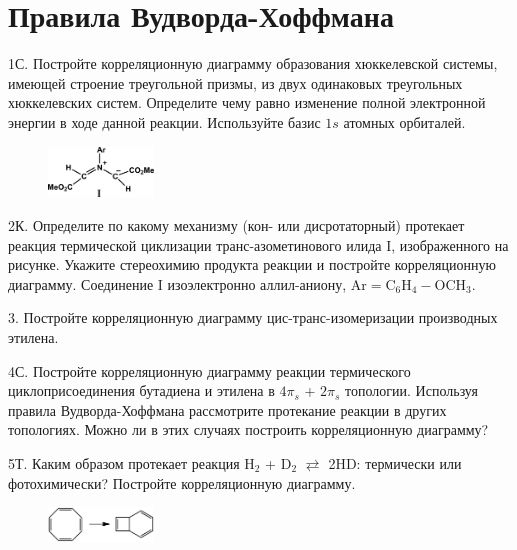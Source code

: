\setmainfont{Noto Serif}
\setsansfont{Noto Sans}
\setmonofont{Noto Sans Mono}

\section{Правила Вудворда-Хоффмана}
1С. Постройте корреляционную диаграмму образования хюккелевской системы, имеющей строение треугольной призмы, из двух одинаковых треугольных хюккелевских систем. Определите чему равно изменение полной электронной энергии в ходе данной реакции. Используйте базис $1s$ атомных орбиталей.
\par
\begin{figure} %
    \centering
    \vspace{-1mm}
    \includegraphics[width=28mm]{images/Fig_2_1_2.png}
    \vspace{0mm}
\end{figure}
2К. Определите по какому механизму (кон- или дисротаторный) протекает реакция термической циклизации транс-азометинового илида I, изображенного на рисунке. Укажите стереохимию продукта реакции и постройте корреляционную диаграмму. Соединение I изоэлектронно аллил-аниону, $\text{Ar}=\text{C}_6\text{H}_4-\text{OCH}_3$.
\par
3. Постройте корреляционную диаграмму цис-транс-изомеризации производных этилена.
\par
4С. Постройте корреляционную диаграмму реакции термического циклоприсоединения бутадиена и этилена в $4\pi_s$ + $2\pi_s$ топологии. Используя правила Вудворда-Хоффмана рассмотрите протекание реакции в других топологиях. Можно ли в этих случаях построить корреляционную диаграмму?
\par
5Т. Каким образом протекает реакция $\text{H}_2$ + $\text{D}_2$ $\rightleftarrows$ 2$\text{HD}$:  термически или фотохимически? Постройте корреляционную диаграмму.
\par
\begin{figure} %
    \centering
    \vspace{-1.9mm}
    \includegraphics[width=28mm]{images/Fig_2_1_5.png}
    \vspace{-3.4mm}
\end{figure}
